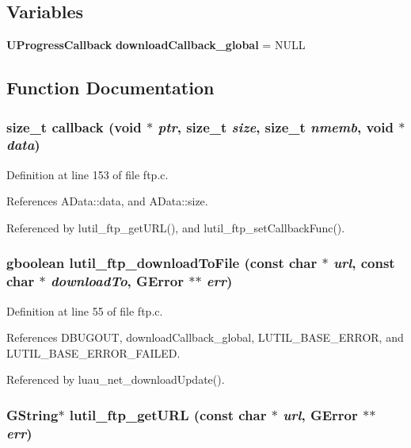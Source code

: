 \subsection*{Variables}
\begin{CompactItemize}
\item 
{\bf UProgress\-Callback} {\bf download\-Callback\_\-global} = NULL
\end{CompactItemize}


\subsection{Function Documentation}
\subsubsection{\setlength{\rightskip}{0pt plus 5cm}size\_\-t callback (void $\ast$ {\em ptr}, size\_\-t {\em size}, size\_\-t {\em nmemb}, void $\ast$ {\em data})\hspace{0.3cm}{\tt  [static]}}\label{ftp_8c_a1}




Definition at line 153 of file ftp.c.

References AData::data, and AData::size.

Referenced by lutil\_\-ftp\_\-get\-URL(), and lutil\_\-ftp\_\-set\-Callback\-Func().
\subsubsection{\setlength{\rightskip}{0pt plus 5cm}gboolean lutil\_\-ftp\_\-download\-To\-File (const char $\ast$ {\em url}, const char $\ast$ {\em download\-To}, GError $\ast$$\ast$ {\em err})}\label{ftp_8c_a2}




Definition at line 55 of file ftp.c.

References DBUGOUT, download\-Callback\_\-global, LUTIL\_\-BASE\_\-ERROR, and LUTIL\_\-BASE\_\-ERROR\_\-FAILED.

Referenced by luau\_\-net\_\-download\-Update().
\subsubsection{\setlength{\rightskip}{0pt plus 5cm}GString$\ast$ lutil\_\-ftp\_\-get\-URL (const char $\ast$ {\em url}, GError $\ast$$\ast$ {\em err})}\label{ftp_8c_a3}




